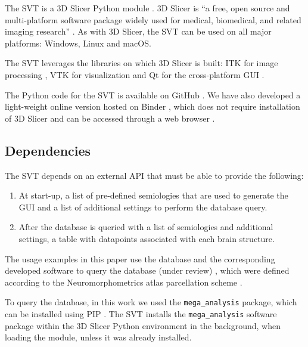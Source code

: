 The \ac{SVT} is a 3D Slicer Python module \cite{fedorov_3d_2012}.
3D Slicer is ``a free, open source and multi-platform software package widely used for medical, biomedical, and related imaging research''%
.
As with 3D Slicer, the \ac{SVT} can be used on all major platforms: Windows, Linux and macOS.

The \ac{SVT} leverages the libraries on which 3D Slicer is built:
\ac{ITK} for image processing \cite{mccormick_itk_2014},
\ac{VTK} for visualization \cite{schroeder_visualization_2006}
and Qt for the cross-platform \ac{GUI}%
.

The Python code for the \ac{SVT} is available on GitHub%
\fnurl{\svtgithubtagged}.
We have also developed a light-weight online version hosted on Binder \cite{bussonnier_binder_2018}, which does not require installation of 3D Slicer and can be accessed through a web browser%
\fnurl{\svtweb}.


\subsection{Dependencies}
\label{sec:svt_dependencies}

The \ac{SVT} depends on an external \ac{API} that must be able to provide the following:
\begin{enumerate}
  \item At start-up, a list of pre-defined semiologies that are used to generate the \ac{GUI} and a list of additional settings to perform the database query.
  \item After the database is queried with a list of semiologies and additional settings, a table with datapoints associated with each brain structure.
\end{enumerate}

The usage examples in this paper use the \svtdatabase database and the corresponding developed software to query the database \cite{alim-marvasti_cortical_2022} (under review) \cite{alim-marvasti_probabilistic_2022}, which were defined according to the Neuromorphometrics atlas parcellation scheme%
.

To query the \svtdatabase database, in this work we used the \texttt{mega\_analysis} package, which can be installed using \ac{PIP} \cite{alim-marvasti_cortical_2022}.
The \ac{SVT} installs the \texttt{mega\_analysis} software package within the 3D Slicer Python environment in the background, when loading the module, unless it was already installed.



